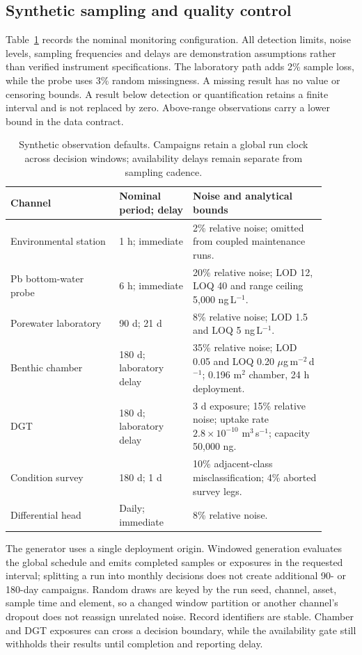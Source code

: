 \subsection{Synthetic sampling and quality control}

Table~\ref{tab:monitoring-defaults} records the nominal monitoring configuration. All detection limits, noise levels, sampling frequencies and delays are demonstration assumptions rather than verified instrument specifications. The laboratory path adds 2\% sample loss, while the probe uses 3\% random missingness. A missing result has no value or censoring bounds. A result below detection or quantification retains a finite interval and is not replaced by zero. Above-range observations carry a lower bound in the data contract.

\begin{table}[htbp]
\centering\small
\caption{Synthetic observation defaults. Campaigns retain a global run clock across decision windows; availability delays remain separate from sampling cadence.}
\label{tab:monitoring-defaults}
\begin{tabular}{p{0.31\linewidth}p{0.21\linewidth}p{0.38\linewidth}}
\toprule
Channel & Nominal period; delay & Noise and analytical bounds \\
\midrule
Environmental station & 1 h; immediate & 2\% relative noise; omitted from coupled maintenance runs. \\
Pb bottom-water probe & 6 h; immediate & 20\% relative noise; LOD 12, LOQ 40 and range ceiling 5,000 ng\,L$^{-1}$. \\
Porewater laboratory & 90 d; 21 d & 8\% relative noise; LOD 1.5 and LOQ 5 ng\,L$^{-1}$. \\
Benthic chamber & 180 d; laboratory delay & 35\% relative noise; LOD 0.05 and LOQ 0.20 $\mu$g\,m$^{-2}$\,d$^{-1}$; 0.196 m$^2$ chamber, 24 h deployment. \\
DGT & 180 d; laboratory delay & 3 d exposure; 15\% relative noise; uptake rate $2.8\times10^{-10}$ m$^3$\,s$^{-1}$; capacity 50,000 ng. \\
Condition survey & 180 d; 1 d & 10\% adjacent-class misclassification; 4\% aborted survey legs. \\
Differential head & Daily; immediate & 8\% relative noise. \\
\bottomrule
\end{tabular}
\end{table}

The generator uses a single deployment origin. Windowed generation evaluates the global schedule and emits completed samples or exposures in the requested interval; splitting a run into monthly decisions does not create additional 90- or 180-day campaigns. Random draws are keyed by the run seed, channel, asset, sample time and element, so a changed window partition or another channel's dropout does not reassign unrelated noise. Record identifiers are stable. Chamber and DGT exposures can cross a decision boundary, while the availability gate still withholds their results until completion and reporting delay.

